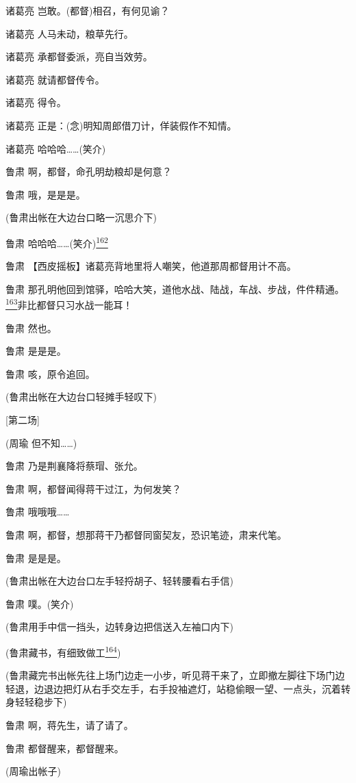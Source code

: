 诸葛亮 岂敢。(都督)相召，有何见谕？

诸葛亮 人马未动，粮草先行。

诸葛亮 承都督委派，亮自当效劳。

诸葛亮 就请都督传令。

诸葛亮 得令。

诸葛亮 正是：(念)明知周郎借刀计，佯装假作不知情。

诸葛亮 哈哈哈\ldots{}\ldots{}(笑介)

鲁肃 啊，都督，命孔明劫粮却是何意？

鲁肃 哦，是是是。

(鲁肃出帐在大边台口略一沉思介下)

鲁肃
哈哈哈\ldots{}\ldots{}(笑介)\protect\hyperlink{fn162}{\textsuperscript{162}}

鲁肃 【西皮摇板】诸葛亮背地里将人嘲笑，他道那周都督用计不高。

鲁肃
那孔明他回到馆驿，哈哈大笑，道他水战、陆战，车战、步战，件件精通。\protect\hyperlink{fn163}{\textsuperscript{163}}非比都督只习水战一能耳！

鲁肃 然也。

鲁肃 是是是。

鲁肃 咳，原令追回。

(鲁肃出帐在大边台口轻摊手轻叹下)

{[}第二场{]}

(周瑜 但不知\ldots{}\ldots{})

鲁肃 乃是荆襄降将蔡瑁、张允。

鲁肃 啊，都督闻得蒋干过江，为何发笑？

鲁肃 哦哦哦\ldots{}\ldots{}

鲁肃 啊，都督，想那蒋干乃都督同窗契友，恐识笔迹，肃来代笔。

鲁肃 是是是。

(鲁肃出帐在大边台口左手轻捋胡子、轻转腰看右手信)

鲁肃 噗。(笑介)

(鲁肃用手中信一挡头，边转身边把信送入左袖口内下)

(鲁肃藏书，有细致做工\protect\hyperlink{fn164}{\textsuperscript{164}})

(鲁肃藏完书出帐先往上场门边走一小步，听见蒋干来了，立即撤左脚往下场门边轻退，边退边把灯从右手交左手，右手投袖遮灯，站稳偷眼一望、一点头，沉着转身轻轻稳步下)

鲁肃 啊，蒋先生，请了请了。

鲁肃 都督醒来，都督醒来。

(周瑜出帐子)

